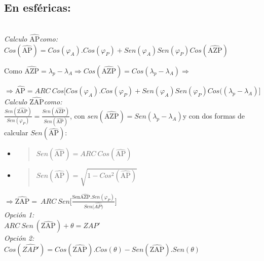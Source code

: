 \documentclass[spanish]{article}
\begin{document}
\subsection{En esféricas:}\\

\emph{Calculo} \(\widehat{\text{AP}}\)\emph{como:}\\

\(Cos(\widehat{\text{AP}}) = Cos(\varphi_{A}).Cos(\varphi_{P}) + Sen(\varphi_{A})Sen(\varphi_{P})Cos(\widehat{\text{AZP}})\)

Como
\(\widehat{\text{AZP}} = \lambda_{p} - \lambda_{A} \Rightarrow Cos(\widehat{\text{AZP}}) = Cos(\lambda_{p} - \lambda_{A}) \Rightarrow\)

\(\Rightarrow \widehat{\text{AP}} = ARC\ Cos\lbrack Cos(\varphi_{A}).Cos(\varphi_{P}) + Sen(\varphi_{A})Sen(\varphi_{P})Cos((\lambda_{p} - \lambda_{A})\rbrack\)\\

\emph{Calculo} \(\widehat{\text{ZAP}}\)\emph{como:}\\

\(\frac{Sen(\widehat{\text{ZAP}})}{Sen(\varphi_{P})} = \frac{Sen(\widehat{\text{AZP}})}{Sen(\widehat{\text{AP}})}\),
con \(sen(\widehat{\text{AZP}}) = Sen(\lambda_{p} - \lambda_{A})\)y con
dos formas de calcular \(Sen(\widehat{\text{AP}})\):

\begin{itemize}
\item
  \begin{quote}
  \(Sen(\widehat{\text{AP}}) = ARC\ Cos(\widehat{\text{AP}})\)
  \end{quote}
\item
  \begin{quote}
  \(Sen(\widehat{\text{AP}}) = \sqrt{1-Cos^2(\widehat{\text{AP}})}\)
  \end{quote}
\end{itemize}

\(\Rightarrow \widehat{\text{ZAP}} = \ ARC\ Sen\lbrack\frac{\text{Sen}\widehat{\text{AZP}}.Sen(\varphi_{P})}{Sen(\widehat{AP)}}\rbrack\)\\

\emph{Opción 1:}\\

\(ARC\ Sen\ (\widehat{\text{ZAP}}) + \theta = \widehat{ZAP'}\)\\

\emph{Opción 2:}\\

\(Cos(\widehat{ZAP'}) = Cos(\widehat{\text{ZAP}}).Cos(\theta) - Sen(\widehat{\text{ZAP}}).Sen(\theta)\)
\end{document}
